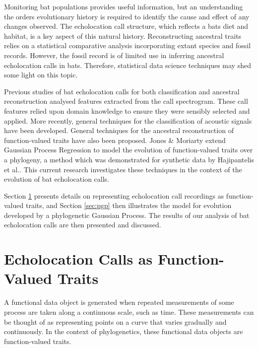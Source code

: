 \documentclass{ws-rv9x6}
\begin{document}
Monitoring bat populations provides useful information, but an understanding the orders evolutionary history is required to identify the cause and effect of any changes observed. The echolocation call structure, which reflects a bats diet and habitat,\cite{aldridge1987morphology}  is a key aspect of this natural history. Reconstructing ancestral traits\cite{joy2016ancestral} relies on a statistical comparative analysis incorporating extant species and fossil records. \cite{felsenstein2004inferring} However, the fossil record is of limited use in inferring ancestral echolocation calls in bats. Therefore, statistical data science techniques may shed some light on this topic.

Previous studies of bat echolocation calls for both classification \cite{walters2012continental} and ancestral reconstruction \cite{collen2012evolution} analysed features extracted from the call spectrogram. These call features relied upon domain knowledge to ensure they were sensibly selected and applied. More recently, general techniques for the classification of acoustic signals have been developed. \cite{stathopoulos2014bat} \cite{damoulas2010bayesian} General techniques for the ancestral reconstruction of function-valued traits have also been proposed. \cite{group2012phylogenetic} Jones \& Moriarty \cite{jones2013evolutionary} extend Gaussian Process Regression \cite{rasmussen2006gaussian} to model the evolution of function-valued traits\cite{meyer2005up} over a phylogeny, a method which was demonstrated for synthetic data by Hajipantelis et al.\cite{hadjipantelis2013function}. This current research investigates these techniques in the context of the evolution of bat echolocation calls.

Section \ref{sec:funrep} presents details on representing echolocation call recordings as function-valued traits, and Section \ref{sec:pgp} then illustrates the model for evolution developed by a phylogenetic Gaussian Process. The results of our analysis of bat echolocation calls are then presented and discussed. 
\section{Echolocation Calls as Function-Valued Traits}
\label{sec:funrep}
A functional data object is generated when repeated measurements of some process are taken along a continuous scale, such as time. \cite{ramsay2006functional} 
These measurements can be thought of as representing points on a curve that varies gradually and continuously. In the context of phylogenetics, these functional data objects are function-valued traits. \cite{meyer2005up}
\end{document}

